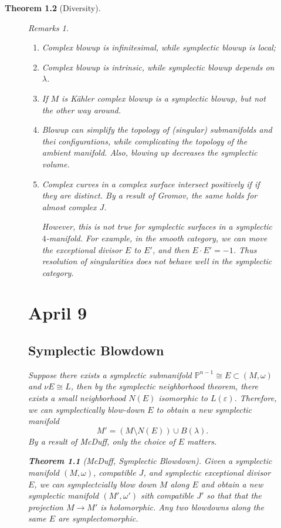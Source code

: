 \documentclass[leqno, openany]{memoir}
\newtheorem{thm}{Theorem}[chapter]
\theoremstyle{definition}
\theoremstyle{remark}
\newtheorem{rmks}[thm]{Remarks}
\theoremstyle{plain}
\theoremstyle{definition}
\theoremstyle{remark}
\renewcommand{\P}{\mathbb{P}}
\newcommand{\ep}{\varepsilon}
\begin{document}
\begin{thm}[Diversity]
\begin{figure}[H]
    \begin{rmks} \begin{enumerate} \item Complex blowup is infinitesimal, while
        symplectic blowup is local; \item Complex blowup is intrinsic, while
        symplectic blowup depends on $\lambda$.  \item If $M$ is K\"ahler
        complex blowup is a symplectic blowup, but not the other way around.
    \item Blowup can simplify the topology of (singular) submanifolds and thei
        configurations, while complicating the topology of the ambient
        manifold. Also, blowing up decreases the symplectic volume.  \item
        Complex curves in a complex surface intersect positively if if they are
        distinct. By a result of Gromov, the same holds for almost complex $J$.

                However, this is not true for symplectic surfaces in a
        symplectic $4$-manifold. For example, in the smooth category, we can
move the exceptional divisor $E$ to $E'$, and then $E \cdot E' = -1$. Thus
resolution of singularities does not behave well in the symplectic category.
\end{enumerate} \end{rmks}

    \chapter{April 9}%
    
    \section{Symplectic Blowdown}%
    
    Suppose there exists a symplectic submanifold $\P^{n-1} \cong E \subset (M,
    \omega)$ and $\nu E \cong L$, then by the symplectic neighborhood theorem,
    there exists a small neighborhood $N(E)$ isomorphic to $L(\ep)$. Therefore,
    we can \textit{symplectically blow-down} $E$ to obtain a new symplectic
    manifold \[ M' = (M \setminus N(E)) \cup B(\lambda). \] By a result of
    McDuff, only the choice of $E$ matters.

    \begin{thm}[McDuff, Symplectic Blowdown] Given a symplectic manifold $(M,
        \omega)$, compatible $J$, and symplectic exceptional divisor $E$, we
        can symplectcially blow down $M$ along $E$ and obtain a new symplectic
        manifold $(M', \omega')$ sith compatible $J'$ so that that the
        projection $M \to M'$ is holomorphic. Any two blowdowns along the same
        $E$ are symplectomorphic.  \end{thm}


\end{figure}
\end{thm}
\end{document}
